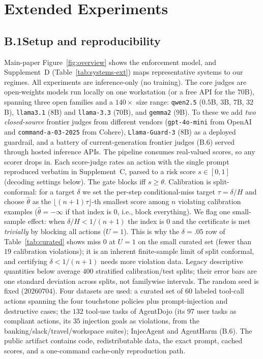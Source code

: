 \section{Extended Experiments}
\label{app:extra}



\subsection*{B.1\quad Setup and reproducibility}
Main-paper Figure~\ref{fig:overview} shows the enforcement model, and Supplement~D (Table~\ref{tab:systems-ext}) maps representative systems to our regimes. All experiments are inference-only (no training). The core judges are open-weights
models run locally on one workstation (or a free API for the $70$B), spanning three open
families and a $140{\times}$ size range: \texttt{qwen2.5} ($0.5$B, $3$B, $7$B, $32$B),
\texttt{llama3.1} ($8$B) and \texttt{llama-3.3} ($70$B), and \texttt{gemma2} ($9$B). To
these we add \emph{two closed-source} frontier judges from different vendors
(\texttt{gpt-4o-mini} from OpenAI and \texttt{command-a-03-2025} from Cohere),
\texttt{Llama-Guard-3} ($8$B) as a deployed guardrail, and a battery of
current-generation frontier judges (B.6) served through hosted inference APIs.
The pipeline consumes real-valued scores, so any scorer drops in. Each
score-judge rates an action with the single prompt reproduced verbatim in Supplement~C,
parsed to a risk score $s\in[0,1]$ (decoding settings below).
The gate blocks iff $s\ge\theta$. Calibration is split-conformal: for a target
$\delta$ we set the per-step conditional-miss target $\tau=\delta/H$ and choose
$\hat\theta$ as the $\lfloor(n{+}1)\tau\rfloor$-th smallest score among $n$
violating calibration examples ($\hat\theta=-\infty$ if that index is $0$, i.e.,
block everything). We flag one small-sample effect: when $\delta/H<1/(n{+}1)$ the index
is $0$ and the certificate is met \emph{trivially} by blocking all actions ($U=1$).
This is why the $\delta=.05$ row of Table~\ref{tab:curated} shows miss $0$ at $U=1$ on the small
curated set (fewer than $19$ calibration violations); it is an inherent
finite-sample limit of split conformal, and certifying $\delta<1/(n{+}1)$ needs more
violation data. Legacy descriptive quantities below average $400$ stratified
calibration/test splits; their error bars are one standard deviation across
splits, not familywise intervals. The
random seed is fixed ($20260704$). Four datasets are used: a curated set of $60$
labeled tool-call actions spanning the four touchstone policies plus
prompt-injection and destructive cases; the $132$ tool-use tasks of AgentDojo
\citep{debenedetti2024agentdojo} (its $97$ user tasks as compliant actions, its
$35$ injection goals as violations, from the banking/slack/travel/workspace suites);
InjecAgent and AgentHarm (B.6). The public
artifact contains code, redistributable data, the exact prompt, cached scores,
and a one-command cache-only reproduction path.

